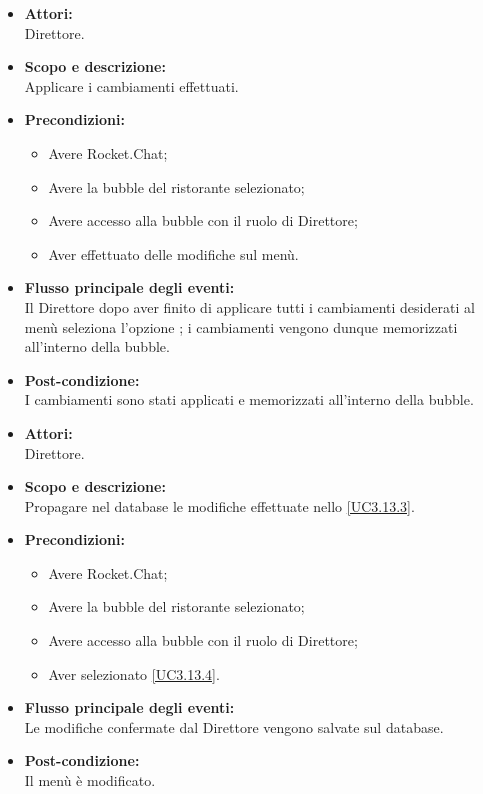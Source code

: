 
\begin{itemize}
	\item \textbf{Attori:}
	\\Direttore.
	\item \textbf{Scopo e descrizione:} 
	\\Applicare i cambiamenti effettuati.
	\item \textbf{Precondizioni:}
	\begin{itemize}
		\item Avere Rocket.Chat;
		\item Avere la bubble del ristorante selezionato;
		\item Avere accesso alla bubble con il ruolo di Direttore;
		\item Aver effettuato delle modifiche sul menù.
	\end{itemize}
	\item \textbf{Flusso principale degli eventi:}
	\\Il Direttore dopo aver finito di applicare tutti i cambiamenti desiderati al menù seleziona l'opzione ; i cambiamenti vengono dunque memorizzati all'interno della bubble.
	\item \textbf{Post-condizione:}
	\\I cambiamenti sono stati applicati e memorizzati all'interno della bubble.
\end{itemize}


\begin{itemize}
	\item \textbf{Attori:}
	\\Direttore.
	\item \textbf{Scopo e descrizione:} 
	\\Propagare nel database le modifiche effettuate nello \ref{UC3.13.3}.
	\item \textbf{Precondizioni:}
	\begin{itemize}
		\item Avere Rocket.Chat;
		\item Avere la bubble del ristorante selezionato;
		\item Avere accesso alla bubble con il ruolo di Direttore;
		\item Aver selezionato  \ref{UC3.13.4}.
	\end{itemize}
	\item \textbf{Flusso principale degli eventi:}
	\\Le modifiche confermate dal Direttore vengono salvate sul database.
	\item \textbf{Post-condizione:}
	\\Il menù è modificato.
\end{itemize}

